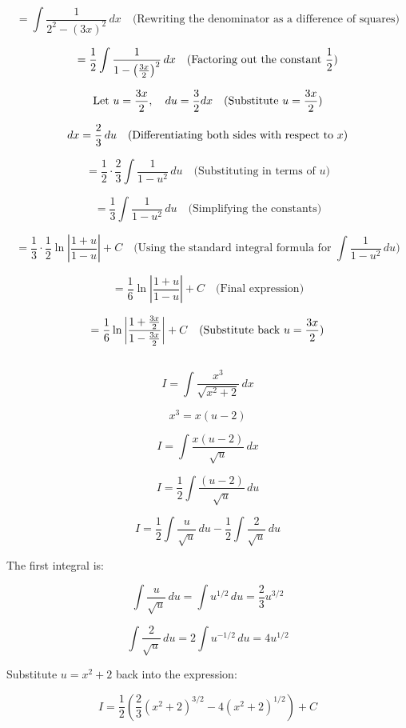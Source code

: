 \documentclass[12pt]{article}
\begin{document}
\[
= \int \frac{1}{2^2 - (3x)^2} \, dx \quad \text{(Rewriting the denominator as a difference of squares)}
\]

\[
= \frac{1}{2} \int \frac{1}{1 - \left( \frac{3x}{2} \right)^2} \, dx \quad \text{(Factoring out the constant \( \frac{1}{2} \))}
\]

\[
\text{Let } u = \frac{3x}{2}, \quad du = \frac{3}{2} dx \quad \text{(Substitute \( u = \frac{3x}{2} \))}
\]

\[
dx = \frac{2}{3} \, du \quad \text{(Differentiating both sides with respect to \( x \))}
\]

\[
= \frac{1}{2} \cdot \frac{2}{3} \int \frac{1}{1 - u^2} \, du \quad \text{(Substituting in terms of } u \text{)}
\]

\[
= \frac{1}{3} \int \frac{1}{1 - u^2} \, du \quad \text{(Simplifying the constants)}
\]

\[
= \frac{1}{3} \cdot \frac{1}{2} \ln \left| \frac{1 + u}{1 - u} \right| + C \quad \text{(Using the standard integral formula for } \int \frac{1}{1 - u^2} \, du)
\]

\[
= \frac{1}{6} \ln \left| \frac{1 + u}{1 - u} \right| + C \quad \text{(Final expression)}
\]

\[
= \frac{1}{6} \ln \left| \frac{1 + \frac{3x}{2}}{1 - \frac{3x}{2}} \right| + C \quad \text{(Substitute back \( u = \frac{3x}{2} \))}
\]

\subsection{}

\[
I = \int \frac{x^3}{\sqrt{x^2 + 2}} \, dx
\]


\[
x^3 = x(u - 2)
\]


\[
I = \int \frac{x(u - 2)}{\sqrt{u}} \, dx
\]



\[
I = \frac{1}{2} \int \frac{(u - 2)}{\sqrt{u}} \, du
\]

\[
I = \frac{1}{2} \int \frac{u}{\sqrt{u}} \, du - \frac{1}{2} \int \frac{2}{\sqrt{u}} \, du
\]

The first integral is:

\[
\int \frac{u}{\sqrt{u}} \, du = \int u^{1/2} \, du = \frac{2}{3} u^{3/2}
\]


\[
\int \frac{2}{\sqrt{u}} \, du = 2 \int u^{-1/2} \, du = 4 u^{1/2}
\]

Substitute \( u = x^2 + 2 \) back into the expression:

\[
I = \frac{1}{2} \left( \frac{2}{3} (x^2 + 2)^{3/2} - 4 (x^2 + 2)^{1/2} \right) + C
\]
\end{document}
